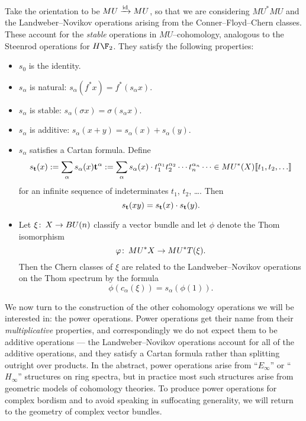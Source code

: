 \begin{definition}
Take the orientation to be $MU \xrightarrow{\mathrm{id}} MU$, so that we are considering $MU^* MU$ and the Landweber--Novikov operations arising from the Conner--Floyd--Chern classes.  These account for the \emph{stable} operations in $MU$--cohomology, analogous to the Steenrod operations for $H\F_2$.  They satisfy the following properties:
\begin{itemize}
\item $s_0$ is the identity.
\item $s_\alpha$ is natural: $s_\alpha(f^* x) = f^*(s_\alpha x)$.
\item $s_\alpha$ is stable: $s_\alpha(\sigma x) = \sigma(s_\alpha x)$.
\item $s_\alpha$ is additive: $s_\alpha(x + y) = s_\alpha(x) + s_\alpha(y)$.
\item $s_\alpha$ satisfies a Cartan formula.  Define \[s_{\mathbf t}(x) := \sum_{\alpha} s_\alpha(x) \mathbf t^\alpha := \sum_\alpha s_\alpha(x) \cdot t_1^{\alpha_1} t_2^{\alpha_2} \cdots t_n^{\alpha_n} \cdots \in MU^*(X)\llbracket{t_1, t_2, \ldots}\rrbracket\] for an infinite sequence of indeterminates $t_1$, $t_2$, \ldots.  Then \[s_{\mathbf t}(x y) = s_{\mathbf t}(x) \cdot s_{\mathbf t}(y).\]
\item Let $\xi\colon\thinspace X \to BU(n)$ classify a vector bundle and let $\phi$ denote the Thom isomorphism \[\varphi\colon\thinspace MU^* X \to MU^* T(\xi).\]  Then the Chern classes of $\xi$ are related to the Landweber--Novikov operations on the Thom spectrum by the formula \[\phi(c_\alpha(\xi)) = s_\alpha(\phi(1)).\]
\end{itemize}
\end{definition}


We now turn to the construction of the other cohomology operations we will be interested in: the power operations.  Power operations get their name from their \emph{multiplicative} properties, and correspondingly we do not expect them to be additive operations --- the Landweber--Novikov operations account for all of the additive operations, and they satisfy a Cartan formula rather than splitting outright over products.  In the abstract, power operations arise from ``$E_\infty$'' or ``$H_\infty$'' structures on ring spectra, but in practice most such structures arise from geometric models of cohomology theories.  To produce power operations for complex bordism and to avoid speaking in suffocating generality, we will return to the geometry of complex vector bundles.

